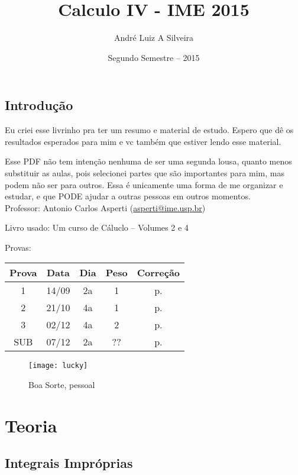 \documentclass[12pt,openany]{book}
\title{Calculo IV - IME 2015}
\author{André Luiz A Silveira}
\date{Segundo Semestre -- 2015}
\begin{document}
\maketitle

\tableofcontents


\chapter*{Introdução}
\label{chap:c0}

\hspace{5mm} Eu criei esse livrinho pra ter um resumo e material de estudo. Espero que dê os resultados esperados para mim e vc também que estiver lendo esse material. 

Esse PDF não tem intenção nenhuma de ser uma segunda lousa, quanto menos substituir as aulas, pois selecionei partes que são importantes para mim, mas podem não ser para outros. Essa é unicamente uma forma de me organizar e estudar, e que PODE ajudar a outras pessoas em outros momentos.\\

Professor: 	Antonio Carlos Asperti (\href{mailto:asperti@ime.usp.br}{asperti@ime.usp.br})

Livro usado: Um curso de Cáluclo -- Volumes 2 e 4
\vspace{10mm}

Provas:
\begin{tabular}{|c|c|c|c|c|}
\hline
 Prova & Data & Dia & Peso & Correção \\ \hline 
 1 & 14/09 & 2a & 1 &  p. \pageref{C:P1}\\ \hline
 2 & 21/10 & 4a & 1 &  p. \pageref{C:P2}\\ \hline
 3 & 02/12 & 4a & 2 &  p. \pageref{C:P3}\\ \hline
 SUB & 07/12 & 2a & ?? & p. \pageref{C:SUB} \\\hline
\end{tabular}

\begin{figure}
\centering
\texttt{[image: lucky]}
\caption{Boa Sorte, pessoal}
\label{fig:lucky}
\end{figure}


\part{Teoria}
\chapter{Integrais Impróprias}
\label{chap:c1}
\end{document}
